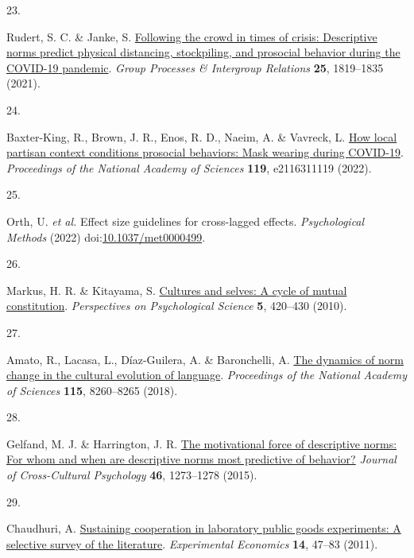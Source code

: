 \documentclass[
  man, donotrepeattitle,floatsintext]{apa6}
\newlength{\cslhangindent}
\newlength{\csllabelwidth}
\newlength{\cslentryspacingunit} %
\newenvironment{CSLReferences}[2] %
 {%
  \setlength{\parindent}{0pt}
  \ifodd #1
  \let\oldpar\par
  \def\par{\hangindent=\cslhangindent\oldpar}
  \fi
  \setlength{\parskip}{#2\cslentryspacingunit}
 }%
 {}
\newcommand{\CSLLeftMargin}[1]{\parbox[t]{\csllabelwidth}{#1}}
\newcommand{\CSLRightInline}[1]{\parbox[t]{\linewidth - \csllabelwidth}{#1}\break}
\begin{document}
\begin{CSLReferences}{0}{0}
\leavevmode{}%
\CSLLeftMargin{23. }%
\CSLRightInline{Rudert, S. C. \& Janke, S. \href{https://doi.org/10.1177/13684302211023562}{Following the crowd in times of crisis: Descriptive norms predict physical distancing, stockpiling, and prosocial behavior during the {COVID-19} pandemic}. \emph{Group Processes \& Intergroup Relations} \textbf{25}, 1819--1835 (2021).}

\leavevmode{}%
\CSLLeftMargin{24. }%
\CSLRightInline{Baxter-King, R., Brown, J. R., Enos, R. D., Naeim, A. \& Vavreck, L. \href{https://doi.org/10.1073/pnas.2116311119}{How local partisan context conditions prosocial behaviors: Mask wearing during {COVID-19}}. \emph{Proceedings of the National Academy of Sciences} \textbf{119}, e2116311119 (2022).}

\leavevmode{}%
\CSLLeftMargin{25. }%
\CSLRightInline{Orth, U. \emph{et al.} Effect size guidelines for cross-lagged effects. \emph{Psychological Methods} (2022) doi:\href{https://doi.org/10.1037/met0000499}{10.1037/met0000499}.}

\leavevmode{}%
\CSLLeftMargin{26. }%
\CSLRightInline{Markus, H. R. \& Kitayama, S. \href{https://doi.org/10.1177/1745691610375557}{Cultures and selves: A cycle of mutual constitution}. \emph{Perspectives on Psychological Science} \textbf{5}, 420--430 (2010).}

\leavevmode{}%
\CSLLeftMargin{27. }%
\CSLRightInline{Amato, R., Lacasa, L., Díaz-Guilera, A. \& Baronchelli, A. \href{https://doi.org/10.1073/pnas.1721059115}{The dynamics of norm change in the cultural evolution of language}. \emph{Proceedings of the National Academy of Sciences} \textbf{115}, 8260--8265 (2018).}

\leavevmode{}%
\CSLLeftMargin{28. }%
\CSLRightInline{Gelfand, M. J. \& Harrington, J. R. \href{https://doi.org/10.1177/0022022115600796}{The motivational force of descriptive norms: For whom and when are descriptive norms most predictive of behavior?} \emph{Journal of Cross-Cultural Psychology} \textbf{46}, 1273--1278 (2015).}

\leavevmode{}%
\CSLLeftMargin{29. }%
\CSLRightInline{Chaudhuri, A. \href{https://doi.org/10.1007/s10683-010-9257-1}{Sustaining cooperation in laboratory public goods experiments: A selective survey of the literature}. \emph{Experimental Economics} \textbf{14}, 47--83 (2011).}


\end{CSLReferences}
\end{document}
